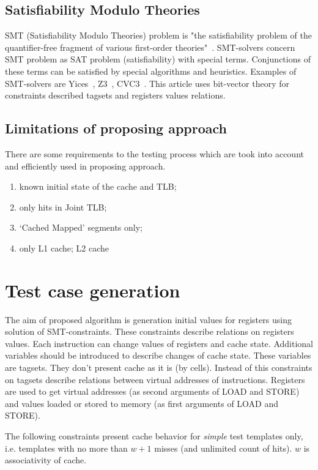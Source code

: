 \documentclass[times, 10pt,twocolumn]{article}
\begin{document}
\subsection{Satisfiability Modulo Theories}
SMT (Satisfiability Modulo Theories) problem is "the satisfiability
problem of the quantifier-free fragment of various first-order
theories"~\cite{SMT}. SMT-solvers concern SMT problem as SAT problem
(satisfiability) with special terms. Conjunctions of these terms can
be satisfied by special algorithms and heuristics. Examples of
SMT-solvers are Yices~\cite{Yices}, Z3~\cite{Z3}, CVC3~\cite{CVC3}.
This article uses bit-vector theory for constraints described
tagsets and registers values relations.

\subsection{Limitations of proposing approach}
There are some requirements to the testing process which are took into account and efficiently used in proposing approach.
\begin{enumerate}
\item known initial state of the cache and TLB;
\item only hits in Joint TLB;
\item `Cached Mapped' segments only;
\item only L1 cache; L2 cache 
\end{enumerate}

\section{Test case generation}

The aim of proposed algorithm is generation initial values for registers using solution of SMT-constraints. These constraints describe relations on registers values. Each instruction can change values of registers and cache state. Additional variables should be introduced to describe changes of cache state. These variables are tagsets. They don't present cache as it is (by cells). Instead of this constraints on tagsets describe relations between virtual addresses of instructions. Registers are used to get virtual addresses (as second arguments of LOAD and STORE) and values loaded or stored to memory (as first arguments of LOAD and STORE).

The following constraints present cache behavior for \emph{simple} test templates only, i.e. templates with no more than $w+1$ misses (and unlimited count of hits). $w$ is associativity of cache.
\end{document}
